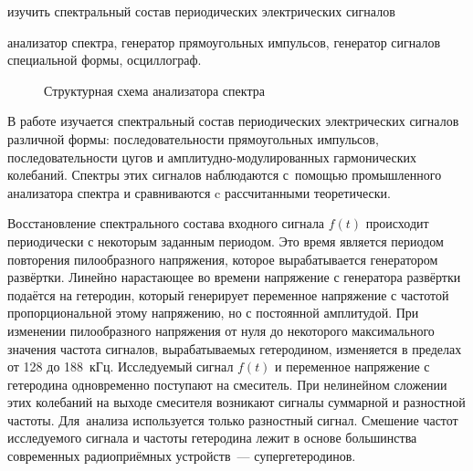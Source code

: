 \setcounter{figure}{0}
\setcounter{equation}{0}

\begin{lab:aim}
	изучить спектральный состав периодических электрических сигналов
\end{lab:aim}

\begin{lab:equipment}
	анализатор спектра, генератор прямоугольных импульсов, генератор сигналов специальной формы, осциллограф.
\end{lab:equipment}

\begin{figure}[h]
	\hfill
	\hspace*{\fill}
	\caption{Структурная схема анализатора спектра}
	\label{fig:611}
\end{figure}

В работе изучается спектральный состав периодических электрических сигналов различной формы: последовательности прямоугольных импульсов, последовательности цугов и амплитудно-модулированных гармонических колебаний. Спектры этих сигналов наблюдаются с~помощью промышленного анализатора спектра и сравниваются c рассчитанными теоретически.

%

Восстановление спектрального состава входного сигнала $f(t)$ происходит периодически с некоторым заданным периодом. Это время является периодом повторения пилообразного напряжения, которое вырабатывается генератором развёртки. Линейно нарастающее во времени напряжение с генератора развёртки подаётся на гетеродин, который генерирует переменное напряжение с частотой пропорциональной этому напряжению, но с постоянной амплитудой. При изменении пилообразного напряжения от нуля до некоторого максимального значения частота сигналов, вырабатываемых гетеродином, изменяется в пределах от 128 до 188~кГц. Исследуемый сигнал $f(t)$ и переменное напряжение с гетеродина одновременно поступают на смеситель. При нелинейном сложении этих колебаний на выходе смесителя возникают сигналы суммарной и разностной частоты. Для~анализа используется только разностный сигнал. Смешение частот исследуемого сигнала и частоты гетеродина лежит в основе большинства современных радиоприёмных устройств~--- супергетеродинов.

